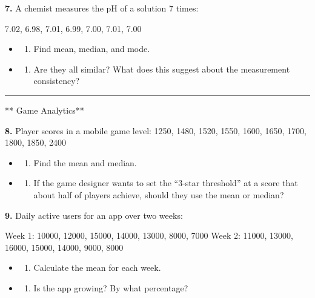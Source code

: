 \documentclass[
  11pt,
]{article}
\providecommand{\tightlist}{%
  \setlength{\itemsep}{0pt}\setlength{\parskip}{0pt}}
\begin{document}
\textbf{7.} A chemist measures the pH of a solution 7 times:

7.02, 6.98, 7.01, 6.99, 7.00, 7.01, 7.00

\begin{itemize}
\item
  \begin{enumerate}
  \def\labelenumi{(\alph{enumi})}
  \tightlist
  \item
    Find mean, median, and mode.
  \end{enumerate}
\item
  \begin{enumerate}
  \def\labelenumi{(\alph{enumi})}
  \setcounter{enumi}{1}
  \tightlist
  \item
    Are they all similar? What does this suggest about the measurement
    consistency?
  \end{enumerate}
\end{itemize}

\begin{center}\rule{0.5\linewidth}{0.5pt}\end{center}

** Game Analytics**

\textbf{8.} Player scores in a mobile game level: 1250, 1480, 1520,
1550, 1600, 1650, 1700, 1800, 1850, 2400

\begin{itemize}
\item
  \begin{enumerate}
  \def\labelenumi{(\alph{enumi})}
  \tightlist
  \item
    Find the mean and median.
  \end{enumerate}
\item
  \begin{enumerate}
  \def\labelenumi{(\alph{enumi})}
  \setcounter{enumi}{1}
  \tightlist
  \item
    If the game designer wants to set the ``3-star threshold'' at a
    score that about half of players achieve, should they use the mean
    or median?
  \end{enumerate}
\end{itemize}

\textbf{9.} Daily active users for an app over two weeks:

Week 1: 10000, 12000, 15000, 14000, 13000, 8000, 7000 Week 2: 11000,
13000, 16000, 15000, 14000, 9000, 8000

\begin{itemize}
\item
  \begin{enumerate}
  \def\labelenumi{(\alph{enumi})}
  \tightlist
  \item
    Calculate the mean for each week.
  \end{enumerate}
\item
  \begin{enumerate}
  \def\labelenumi{(\alph{enumi})}
  \setcounter{enumi}{1}
  \tightlist
  \item
    Is the app growing? By what percentage?
  \end{enumerate}
\end{itemize}
\end{document}
